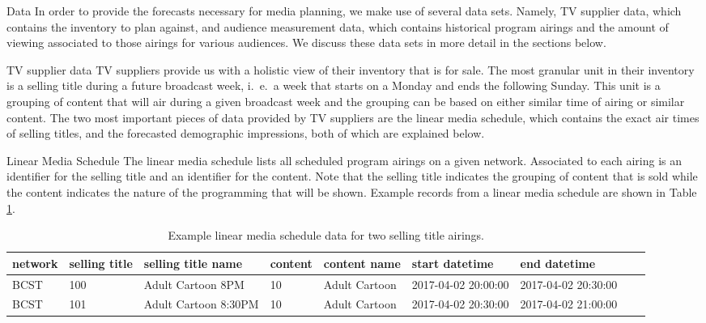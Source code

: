 \begin{chapter}{Data}\label{data}
  In order to provide the forecasts necessary for media planning, we make use
  of several data sets. Namely, TV supplier data, which contains the inventory to plan against, and
  audience measurement data, which contains historical program airings and the
  amount of viewing associated to those airings for various audiences. We discuss
  these data sets in more detail in the sections below.

\begin{section}{TV supplier data}
  TV suppliers provide us with a holistic view of their inventory that is for sale.
  The most granular unit in their inventory is a selling title during a future broadcast week, i.\ e.\ a
  week that starts on a Monday and ends the following Sunday. This
  unit is a grouping of content that will air during a given broadcast week and the grouping can be
  based on either similar time of airing or similar content. The two most important
  pieces of data provided by TV suppliers are the linear media schedule, which contains the exact air times of
  selling titles, and the forecasted demographic impressions, both of which are explained below.

  \begin{subsection}{Linear Media Schedule}
    The linear media schedule lists all scheduled program airings on a given network.
    Associated to each airing is an identifier for the selling title and an identifier for the content.
    Note that the selling title indicates the grouping of content that is sold while the content
    indicates the nature of the programming that will be shown. Example records
    from a linear media schedule are shown in Table \ref{tab:tvsched}.

    \begin{table}[h!]
      \centering
      \begin{adjustbox}{width=1.1\textwidth,center=\textwidth}
        \large
        \begin{tabular}{lllllllll}
          network & selling title & selling title name & content & content name & start datetime & end datetime \\
          \hline
          BCST & 100 & Adult Cartoon 8PM & 10 & Adult Cartoon & 2017-04-02 20:00:00 & 2017-04-02 20:30:00 \\
          BCST & 101 & Adult Cartoon 8:30PM & 10 & Adult Cartoon & 2017-04-02 20:30:00 & 2017-04-02 21:00:00 \\
        \end{tabular}
      \end{adjustbox}
      \caption{Example linear media schedule data for two selling title airings.}\label{tab:tvsched}
    \end{table}


\end{subsection}
\end{section}
\end{chapter}
